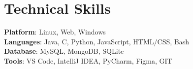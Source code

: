 \documentclass[letterpaper,11pt]{article}
\makeatletter
\newcommand{\resumeItem}[1]{
  \item\small{
    {#1 \vspace{-2pt}}
  }
}
\newcommand{\resumeProjectHeading}[2]{
    \item
    \begin{tabular*}{1.001\textwidth}{l@{\extracolsep{\fill}}r}
      \small#1 & \textbf{\small #2}\\
    \end{tabular*}\vspace{-7pt}
}
\newcommand{\resumeSubHeadingListStart}{\begin{itemize}[leftmargin=0.0in, label={}]}
\newcommand{\resumeSubHeadingListEnd}{\end{itemize}}
\newcommand{\resumeItemListStart}{\begin{itemize}}
\newcommand{\resumeItemListEnd}{\end{itemize}\vspace{-5pt}}
\makeatother
\begin{document}
        
      

      




\vspace{15pt}
\section{Technical Skills}
 \begin{itemize}[leftmargin=0.15in, label={}]
    \small{\item{
     \textbf{Platform}{: Linux, Web, Windows} \\
          \vspace{5pt}
         \textbf{Languages}{: Java, C, Python, JavaScript, HTML/CSS, Bash} \\
          \vspace{5pt}
          \textbf{Database}{: MySQL, MongoDB, SQLite} \\
          \vspace{5pt}
     \textbf{Tools}{: VS Code, IntelliJ IDEA, PyCharm, Figma, GIT} \\
          \vspace{5pt}
    }}
 \end{itemize}
 \vspace{-16pt}
\end{document}
